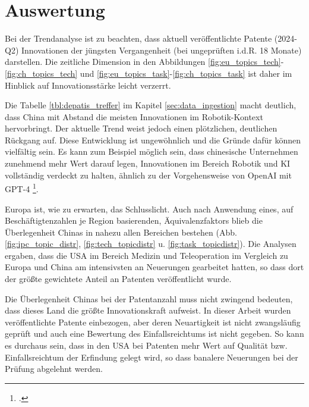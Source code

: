 \newpage
\section{Auswertung}
Bei der Trendanalyse ist zu beachten, dass aktuell veröffentlichte Patente (2024-Q2) Innovationen der jüngsten Vergangenheit (bei ungeprüften i.d.R. 18 Monate) darstellen. Die zeitliche Dimension in den Abbildungen \ref{fig:eu_topics_tech}-\ref{fig:ch_topics_tech} und \ref{fig:eu_topics_task}-\ref{fig:ch_topics_task} ist daher im Hinblick auf Innovationsstärke leicht verzerrt.

Die Tabelle \ref{tbl:depatis_treffer} im Kapitel \ref{sec:data_ingestion} macht deutlich, dass China mit Abstand die meisten Innovationen im Robotik-Kontext hervorbringt. Der aktuelle Trend weist jedoch einen plötzlichen, deutlichen Rückgang auf. Diese Entwicklung ist ungewöhnlich und die Gründe dafür können vielfältig sein. Es kann zum Beispiel möglich sein, dass chinesische Unternehmen zunehmend mehr Wert darauf legen, Innovationen im Bereich Robotik und KI vollständig verdeckt zu halten, ähnlich zu der Vorgehensweise von OpenAI mit GPT-4 \footcite{vincent2023openai}.

Europa ist, wie zu erwarten, das Schlusslicht. Auch nach Anwendung eines, auf Beschäftigtenzahlen je Region basierenden, Äquivalenzfaktors blieb die Überlegenheit Chinas in nahezu allen Bereichen bestehen (Abb. \ref{fig:ipc_topic_distr}, \ref{fig:tech_topicdistr} u. \ref{fig:task_topicdistr}). 
Die Analysen ergaben, dass die USA im Bereich Medizin und Teleoperation im Vergleich zu Europa und China am intensivsten an Neuerungen gearbeitet hatten, so dass dort der größte gewichtete Anteil an Patenten veröffentlicht wurde.

Die Überlegenheit Chinas bei der Patentanzahl muss nicht zwingend bedeuten, dass dieses Land die größte Innovationskraft aufweist. In dieser Arbeit wurden veröffentlichte Patente einbezogen, aber deren Neuartigkeit ist nicht zwangsläufig geprüft und auch eine Bewertung des Einfallsreichtums ist nicht gegeben. So kann es durchaus sein, dass in den USA bei Patenten mehr Wert auf Qualität bzw. Einfallsreichtum der Erfindung gelegt wird, so dass banalere Neuerungen bei der Prüfung abgelehnt werden.


